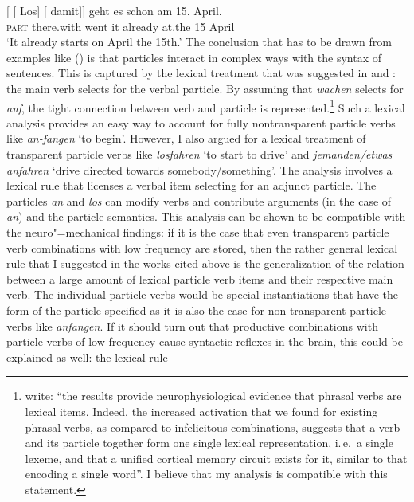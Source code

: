 \begin{exe}
\begin{xlist}[iv.]
\begin{exe}
\begin{xlist}[iv.]
\ex
\gll {}[ [ Los]        [ damit]]    geht es schon   am 15. April.\footnotemark\\
       {}        {}        \textsc{part}  {}        there.with went it already at.the 15 April\\%
%
\glt `It already starts on April the 15th.'
\zl
The conclusion that has to be drawn from examples like () is that particles interact in
complex ways with the syntax of sentences. This is captured by the lexical treatment that was
suggested in  and : the main verb selects for the verbal
particle. By assuming that \emph{wachen} selects for \emph{auf}, the tight connection between verb
and particle is represented.\footnote{%
\citet[]{CSP2010a} write: ``the results provide neurophysiological evidence that
  phrasal verbs are lexical items. Indeed, the increased activation that we found for existing
  phrasal verbs, as compared to infelicitous combinations, suggests that a verb and its particle
  together form one single lexical representation, i.\,e.\ a single lexeme, and that a unified
  cortical memory circuit exists for it, similar to that encoding a single word''.
I believe that my analysis is compatible with this statement.
} Such a lexical analysis provides an easy way to account for fully
nontransparent particle verbs like \emph{an-fangen} `to begin'. However, I also argued for a
lexical treatment of transparent particle verbs like \emph{losfahren} `to start to drive' and
\emph{jemanden/etwas anfahren} `drive directed towards somebody/something'. The
analysis involves a lexical rule that licenses a verbal item selecting for an adjunct
particle. The particles \emph{an} and \emph{los} can modify verbs and contribute arguments (in the
case of \emph{an}) and the particle semantics. This analysis can be shown to be compatible with the
neuro"=mechanical findings: if it is the case that even transparent particle verb combinations with
low frequency are stored, then the rather general lexical rule that I suggested in the works cited above is the
generalization of the relation between a large amount of lexical particle verb items and their respective main
verb. The individual particle verbs would be special instantiations that have the form of the
particle specified as it is also the case for non-transparent particle verbs like \emph{anfangen}.
If it should turn out that productive combinations with particle verbs of low
frequency cause syntactic reflexes in the brain, this could be explained as well: the lexical rule

\end{xlist}
\end{exe}
\end{xlist}
\end{exe}
